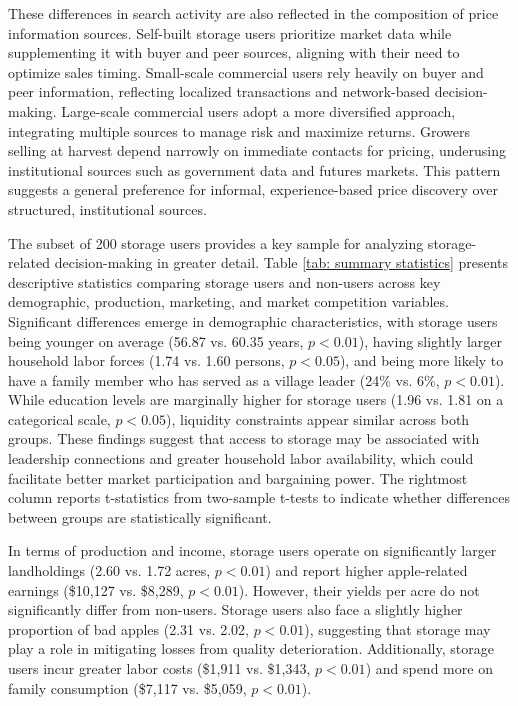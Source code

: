 These differences in search activity are also reflected in the composition of price information sources. Self-built storage users prioritize market data while supplementing it with buyer and peer sources, aligning with their need to optimize sales timing. Small-scale commercial users rely heavily on buyer and peer information, reflecting localized transactions and network-based decision-making. Large-scale commercial users adopt a more diversified approach, integrating multiple sources to manage risk and maximize returns. Growers selling at harvest depend narrowly on immediate contacts for pricing, underusing institutional sources such as government data and futures markets. This pattern suggests a general preference for informal, experience-based price discovery over structured, institutional sources.



The subset of 200 storage users provides a key sample for analyzing storage-related decision-making in greater detail. Table \ref{tab: summary statistics} presents descriptive statistics comparing storage users and non-users across key demographic, production, marketing, and market competition variables. Significant differences emerge in demographic characteristics, with storage users being younger on average (56.87 vs. 60.35 years, $p < 0.01$), having slightly larger household labor forces (1.74 vs. 1.60 persons, $p < 0.05$), and being more likely to have a family member who has served as a village leader (24\% vs. 6\%, $p < 0.01$). While education levels are marginally higher for storage users (1.96 vs. 1.81 on a categorical scale, $p < 0.05$), liquidity constraints appear similar across both groups. These findings suggest that access to storage may be associated with leadership connections and greater household labor availability, which could facilitate better market participation and bargaining power. The rightmost column reports t-statistics from two-sample t-tests to indicate whether differences between groups are statistically significant.  

In terms of production and income, storage users operate on significantly larger landholdings (2.60 vs. 1.72 acres, $p < 0.01$) and report higher apple-related earnings (\$10,127 vs. \$8,289, $p < 0.01$). However, their yields per acre do not significantly differ from non-users. Storage users also face a slightly higher proportion of bad apples (2.31 vs. 2.02, $p < 0.01$), suggesting that storage may play a role in mitigating losses from quality deterioration. Additionally, storage users incur greater labor costs (\$1,911 vs. \$1,343, $p < 0.01$) and spend more on family consumption (\$7,117 vs. \$5,059, $p < 0.01$).  

